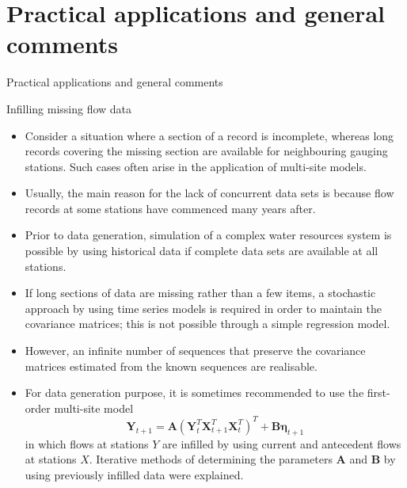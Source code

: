 \documentclass[8pt]{beamer}
\renewcommand{\emph}[1]{\textcolor{myorange}{#1}}
\newcommand{\ve}[1]{\boldsymbol{#1}}
\begin{document}
\section{Practical applications and general comments}
\begin{frame}{Practical applications and general comments}
    \begin{block}{Infilling missing flow data}
    \end{block}
    \begin{itemize}
        \item Consider a situation where a section of a record is incomplete, whereas long records covering the \emph{missing section} are available for \emph{neighbouring gauging stations}. Such cases often arise in the application of \emph{multi-site models}.
        \item Usually, the main reason for the lack of concurrent data sets is because flow records at some stations have commenced many years after. 
        \item Prior to data \emph{generation}, \emph{simulation of a complex water resources system} is possible by using historical data if complete data sets are available at all stations. 
        \item If long sections of data are missing rather than a few items, a stochastic approach by using time series models is required in order to maintain the \emph{covariance matrices}; this is not possible through a \emph{simple regression model}.
        \item However, an infinite number of sequences that preserve the \emph{covariance matrices} estimated from the known sequences are realisable. 
        \item For  data generation purpose, it is sometimes recommended to use the first-order multi-site model
            \[
                \mathbf{Y}_{t+1} = \mathbf{A}(\mathbf{Y}_t^T \mathbf{X}_{t+1}^T \mathbf{X}_t^T)^T + \mathbf{B}\ve{\eta}_{t+1}
            \]
            in  which flows at stations $Y$ are infilled by using current and antecedent flows at stations $X$. Iterative methods of determining the parameters $\mathbf{A}$ and $\mathbf{B}$ by using previously infilled data were  explained. 
    \end{itemize}

\end{frame}
\end{document}
